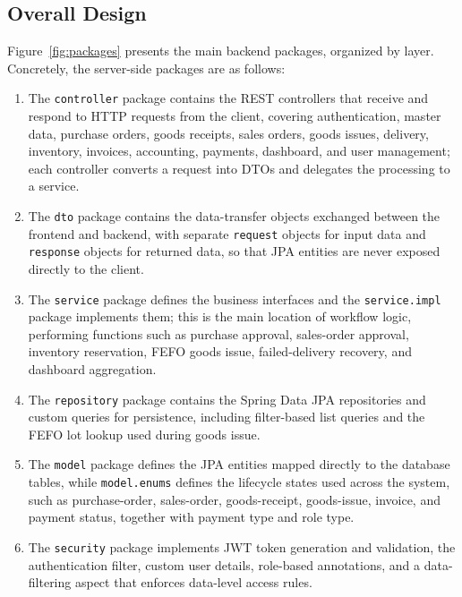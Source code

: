 \subsection{Overall Design}
Figure~\ref{fig:packages} presents the main backend packages, organized by
layer. Concretely, the server-side packages are as follows:
\begin{enumerate}[label=(\roman*)]
  \item The \texttt{controller} package contains the REST controllers that
  receive and respond to HTTP requests from the client, covering authentication,
  master data, purchase orders, goods receipts, sales orders, goods issues,
  delivery, inventory, invoices, accounting, payments, dashboard, and user
  management; each controller converts a request into DTOs and delegates the
  processing to a service.

  \item The \texttt{dto} package contains the data-transfer objects exchanged
  between the frontend and backend, with separate \texttt{request} objects for
  input data and \texttt{response} objects for returned data, so that JPA
  entities are never exposed directly to the client.

  \item The \texttt{service} package defines the business interfaces and the
  \texttt{service.impl} package implements them; this is the main location of
  workflow logic, performing functions such as purchase approval, sales-order
  approval, inventory reservation, FEFO goods issue, failed-delivery recovery,
  and dashboard aggregation.

  \item The \texttt{repository} package contains the Spring Data JPA
  repositories and custom queries for persistence, including filter-based list
  queries and the FEFO lot lookup used during goods issue.

  \item The \texttt{model} package defines the JPA entities mapped directly to
  the database tables, while \texttt{model.enums} defines the lifecycle states
  used across the system, such as purchase-order, sales-order, goods-receipt,
  goods-issue, invoice, and payment status, together with payment type and role
  type.

  \item The \texttt{security} package implements JWT token generation and
  validation, the authentication filter, custom user details, role-based
  annotations, and a data-filtering aspect that enforces data-level access
  rules.


\end{enumerate}
